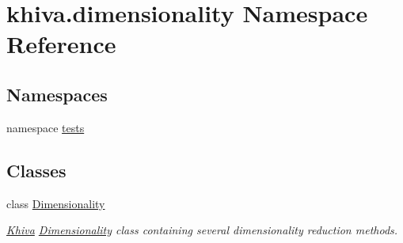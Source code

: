 \hypertarget{namespacekhiva_1_1dimensionality}{}\section{khiva.\+dimensionality Namespace Reference}
\label{namespacekhiva_1_1dimensionality}
\subsection*{Namespaces}
\begin{DoxyCompactItemize}
\item 
namespace \mbox{\hyperlink{namespacekhiva_1_1dimensionality_1_1tests}{tests}}
\end{DoxyCompactItemize}
\subsection*{Classes}
\begin{DoxyCompactItemize}
\item 
class \mbox{\hyperlink{classkhiva_1_1dimensionality_1_1_dimensionality}{Dimensionality}}
\begin{DoxyCompactList}\small\item\em \mbox{\hyperlink{classkhiva_1_1_khiva}{Khiva}} \mbox{\hyperlink{classkhiva_1_1dimensionality_1_1_dimensionality}{Dimensionality}} class containing several dimensionality reduction methods. \end{DoxyCompactList}\end{DoxyCompactItemize}
